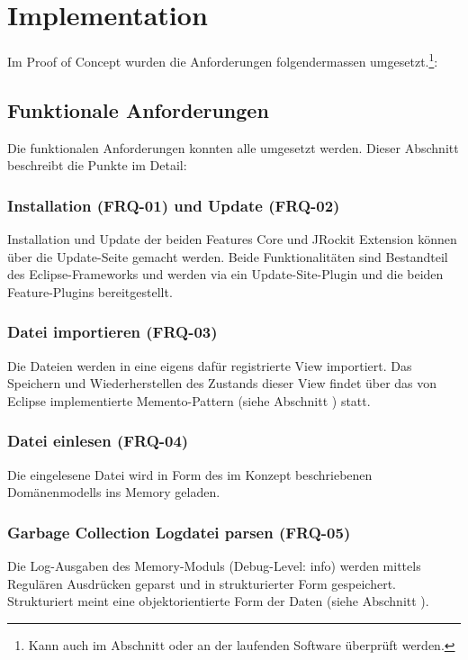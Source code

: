 \chapter{Implementation}\label{implementation}


Im Proof of Concept wurden die Anforderungen folgendermassen umgesetzt.\footnote{Kann auch im Abschnitt  oder an der laufenden Software überprüft werden.}:
\section{Funktionale Anforderungen}
Die funktionalen Anforderungen konnten alle umgesetzt werden. Dieser Abschnitt beschreibt die Punkte im Detail:

\subsection{Installation (FRQ-01) und Update (FRQ-02)}
Installation und Update der beiden Features Core und JRockit Extension können über die Update-Seite gemacht werden. Beide Funktionalitäten sind Bestandteil des Eclipse-Frameworks und werden via ein Update-Site-Plugin und die beiden Feature-Plugins bereitgestellt.

\subsection{Datei importieren (FRQ-03)}
Die Dateien werden in eine eigens dafür registrierte View importiert. Das Speichern und Wiederherstellen des Zustands dieser View findet über das von Eclipse implementierte Memento-Pattern (siehe Abschnitt ) statt. 

\subsection{Datei einlesen (FRQ-04)}
Die eingelesene Datei wird in Form des im Konzept beschriebenen Domänenmodells ins Memory geladen. 

\subsection{Garbage Collection Logdatei parsen (FRQ-05)}
Die Log-Ausgaben des Memory-Moduls (Debug-Level: info) werden mittels Regulären Ausdrücken geparst und in strukturierter Form gespeichert. Strukturiert meint eine objektorientierte Form der Daten (siehe Abschnitt ).

